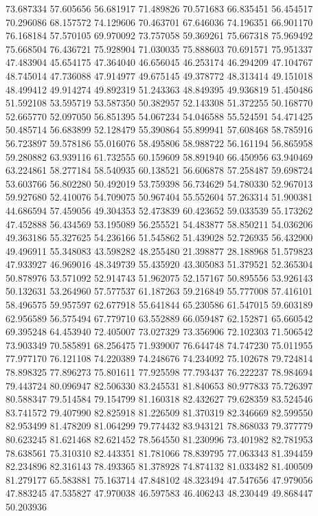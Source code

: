 73.687334
57.605656
56.681917
71.489826
70.571683
66.835451
56.454517
70.296086
68.157572
74.129606
70.463701
67.646036
74.196351
66.901170
76.168184
57.570105
69.970092
73.757058
59.369261
75.667318
75.969492
75.668504
76.436721
75.928904
71.030035
75.888603
70.691571
75.951337
47.483904
45.654175
47.364040
46.656045
46.253174
46.294209
47.104767
48.745014
47.736088
47.914977
49.675145
49.378772
48.313414
49.151018
48.499412
49.914274
49.892319
51.243363
48.849395
49.936819
51.450486
51.592108
53.595719
53.587350
50.382957
52.143308
51.372255
50.168770
52.665770
52.097050
56.851395
54.067234
54.046588
55.524591
54.471425
50.485714
56.683899
52.128479
55.390864
55.899941
57.608468
58.785916
56.723897
59.578186
55.016076
58.495806
58.988722
56.161194
56.865958
59.280882
63.939116
61.732555
60.159609
58.891940
66.450956
63.940469
63.224861
58.277184
58.540935
60.138521
56.606878
57.258487
59.698724
53.603766
56.802280
50.492019
53.759398
56.734629
54.780330
52.967013
59.927680
52.410076
54.709075
50.967404
55.552604
57.263314
51.900381
44.686594
57.459056
49.304353
52.473839
60.423652
59.033539
55.173262
47.452888
56.434569
53.195089
56.255521
54.483877
58.850211
54.036206
49.363186
55.327625
54.236166
51.545862
51.439028
52.726935
56.432900
49.496911
55.348083
43.598282
48.255480
21.398877
28.188968
51.579823
47.933927
46.969016
48.349739
55.435920
43.305083
51.379521
52.365304
50.878976
53.571092
52.914743
51.962075
52.157167
50.895556
53.926143
50.132631
53.264960
57.577537
61.187263
59.216849
55.777008
57.416101
58.496575
59.957597
62.677918
55.641844
65.230586
61.547015
59.603189
62.956589
56.575494
67.779710
63.552889
66.059487
62.152871
65.660542
69.395248
64.453940
72.405007
73.027329
73.356906
72.102303
71.506542
73.903349
70.585891
68.256475
71.939007
76.644748
74.747230
75.011955
77.977170
76.121108
74.220389
74.248676
74.234092
75.102678
79.724814
78.898325
77.896273
75.801611
77.925598
77.793437
76.222237
78.984694
79.443724
80.096947
82.506330
83.245531
81.840653
80.977833
75.726397
80.588347
79.514584
79.154799
81.160318
82.432627
79.628359
83.524546
83.741572
79.407990
82.825918
81.226509
81.370319
82.346669
82.599550
82.953499
81.478209
81.064299
79.774432
83.943121
78.868033
79.377779
80.623245
81.621468
82.621452
78.564550
81.230996
73.401982
82.781953
78.638561
75.310310
82.443351
81.781066
78.839795
77.063343
81.394459
82.234896
82.316143
78.493365
81.378928
74.874132
81.033482
81.400509
81.279177
65.583881
75.163714
47.848102
48.323494
47.547656
47.979056
47.883245
47.535827
47.970038
46.597583
46.406243
48.230449
49.868447
50.203936
